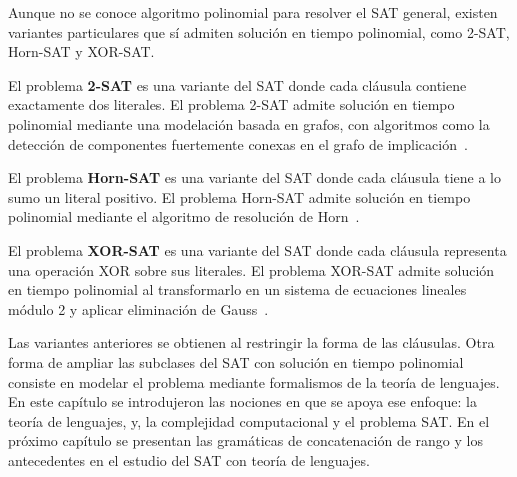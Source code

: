 \documentclass{article}
\theoremstyle{definition}
\theoremstyle{plain}
\theoremstyle{remark}
\begin{document}
Aunque no se conoce algoritmo polinomial para resolver el SAT general,
existen variantes particulares que sí admiten solución en tiempo polinomial,
como 2-SAT, Horn-SAT y XOR-SAT.

El problema \textbf{2-SAT} es una variante del SAT donde cada cláusula
contiene exactamente dos literales. El problema 2-SAT admite solución
en tiempo polinomial mediante una modelación basada en grafos, con
algoritmos como la detección de componentes fuertemente conexas en el
grafo de implicación~\cite{halim2013cp3}.

El problema \textbf{Horn-SAT} es una variante del SAT donde cada
cláusula tiene a lo sumo un literal positivo. El problema Horn-SAT
admite solución en tiempo polinomial mediante el algoritmo de
resolución de Horn~\cite{dowling1984horn}.

El problema \textbf{XOR-SAT} es una variante del SAT donde cada
cláusula representa una operación XOR sobre sus literales. El
problema XOR-SAT admite solución en tiempo polinomial al
transformarlo en un sistema de ecuaciones lineales módulo 2 y aplicar
eliminación de Gauss~\cite{schaefer1978}.

Las variantes anteriores se obtienen al restringir la forma de las
cláusulas. Otra forma de ampliar las subclases del SAT con solución en
tiempo polinomial consiste en modelar el problema mediante formalismos
de la teoría de lenguajes. En este capítulo se introdujeron las nociones
en que se apoya ese enfoque: la teoría de lenguajes,  y,
la complejidad computacional y el problema SAT. En el próximo capítulo
se presentan las gramáticas de concatenación de rango y los antecedentes
en el estudio del SAT con teoría de lenguajes.



\end{document}
